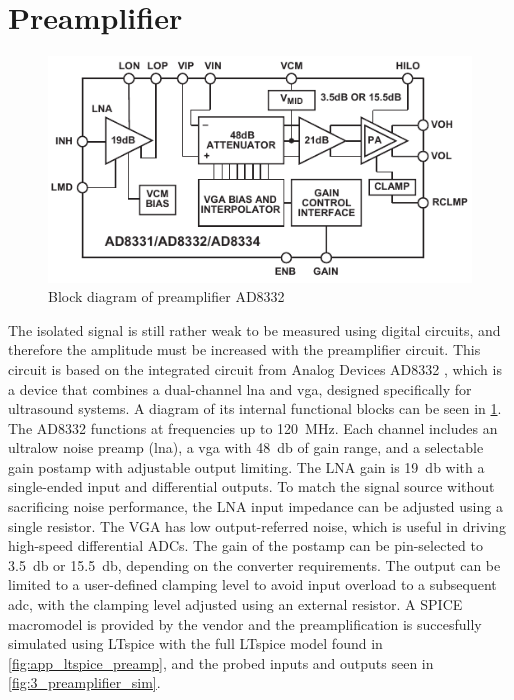 \section{Preamplifier}
\begin{figure}[htbp]
	\centering
	\includegraphics[width=.8\textwidth]{Figures/3_ad8332_block.pdf}
	\caption{Block diagram of preamplifier AD8332 \cite{AD8332}}
	\label{fig:3_preamplifier_block}
\end{figure}
The isolated signal is still rather weak to be measured using digital circuits, and therefore the amplitude must be increased with the preamplifier circuit. This circuit is based on the integrated circuit from Analog Devices AD8332 \cite{AD8332}, which is a device that combines a dual-channel \gls{lna} and \gls{vga}, designed specifically for ultrasound systems. A diagram of its internal functional blocks can be seen in \cref{fig:3_preamplifier_block}. The AD8332 functions at frequencies up to \qty{120}{\mega\hertz}. Each channel includes an ultralow noise preamp (\gls{lna}), a \gls{vga} with \qty{48}{\decibel} of gain range, and a selectable gain postamp with adjustable output limiting. The LNA gain is \qty{19}{\decibel} with a single-ended input and differential outputs. To match the signal source without sacrificing noise performance, the LNA input impedance can be adjusted using a single resistor. The VGA has low output-referred noise, which is useful in driving high-speed differential ADCs. The gain of the postamp can be pin-selected to \qty{3.5}{\decibel} or \qty{15.5}{\decibel}, depending on the converter requirements. The output can be limited to a user-defined clamping level to avoid input overload to a subsequent \gls{adc}, with the clamping level adjusted using an external resistor. A SPICE macromodel is provided by the vendor and the preamplification is succesfully simulated using LTspice with the full LTspice model found in \cref{fig:app_ltspice_preamp}, and the probed inputs and outputs seen in \cref{fig:3_preamplifier_sim}.

